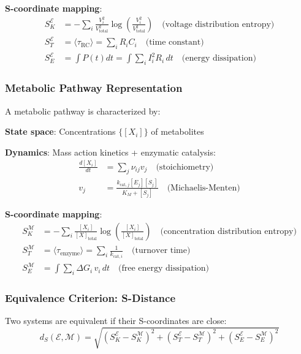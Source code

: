 \documentclass[11pt,a4paper]{article}
\begin{document}
\textbf{S-coordinate mapping}:
\begin{align}
S_K^{\mathcal{E}} &= -\sum_i \frac{V_i^2}{V_{\text{total}}^2} \log\left(\frac{V_i^2}{V_{\text{total}}^2}\right) \quad \text{(voltage distribution entropy)} \\
S_T^{\mathcal{E}} &= \langle \tau_{\text{RC}} \rangle = \sum_i R_i C_i \quad \text{(time constant)} \\
S_E^{\mathcal{E}} &= \int P(t) dt = \int \sum_i I_i^2 R_i \, dt \quad \text{(energy dissipation)}
\end{align}

\subsubsection{Metabolic Pathway Representation}

A metabolic pathway is characterized by:

\textbf{State space}: Concentrations $\{[X_i]\}$ of metabolites

\textbf{Dynamics}: Mass action kinetics + enzymatic catalysis:
\begin{align}
\frac{d[X_i]}{dt} &= \sum_j \nu_{ij} v_j \quad \text{(stoichiometry)} \\
v_j &= \frac{k_{\text{cat},j} [E_j] [S_j]}{K_M + [S_j]} \quad \text{(Michaelis-Menten)}
\end{align}

\textbf{S-coordinate mapping}:
\begin{align}
S_K^{\mathcal{M}} &= -\sum_i \frac{[X_i]}{[X]_{\text{total}}} \log\left(\frac{[X_i]}{[X]_{\text{total}}}\right) \quad \text{(concentration distribution entropy)} \\
S_T^{\mathcal{M}} &= \langle \tau_{\text{enzyme}} \rangle = \sum_i \frac{1}{k_{\text{cat},i}} \quad \text{(turnover time)} \\
S_E^{\mathcal{M}} &= \int \sum_i \Delta G_i \, v_i \, dt \quad \text{(free energy dissipation)}
\end{align}

\subsubsection{Equivalence Criterion: S-Distance}

Two systems are equivalent if their S-coordinates are close:
\begin{equation}
d_S(\mathcal{E}, \mathcal{M}) = \sqrt{(S_K^{\mathcal{E}} - S_K^{\mathcal{M}})^2 + (S_T^{\mathcal{E}} - S_T^{\mathcal{M}})^2 + (S_E^{\mathcal{E}} - S_E^{\mathcal{M}})^2}
\end{equation}
\end{document}
